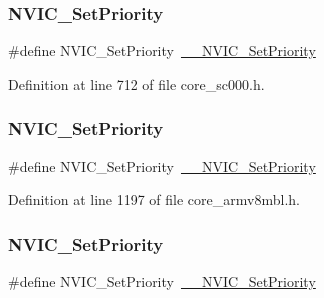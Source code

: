 \subsubsection{\texorpdfstring{N\+V\+I\+C\+\_\+\+Set\+Priority}{NVIC\_SetPriority}\hspace{0.1cm}{\footnotesize\ttfamily [4/13]}}
{\footnotesize\ttfamily \#define N\+V\+I\+C\+\_\+\+Set\+Priority~\hyperlink{group___c_m_s_i_s___core___n_v_i_c_functions_ga505338e23563a9c074910fb14e7d45fd}{\+\_\+\+\_\+\+N\+V\+I\+C\+\_\+\+Set\+Priority}}



Definition at line 712 of file core\+\_\+sc000.\+h.

\mbox{\label{group___c_m_s_i_s___core___n_v_i_c_functions_gae0e9d0e2f7b6133828c71b57d4941c35}} 
\subsubsection{\texorpdfstring{N\+V\+I\+C\+\_\+\+Set\+Priority}{NVIC\_SetPriority}\hspace{0.1cm}{\footnotesize\ttfamily [5/13]}}
{\footnotesize\ttfamily \#define N\+V\+I\+C\+\_\+\+Set\+Priority~\hyperlink{group___c_m_s_i_s___core___n_v_i_c_functions_ga505338e23563a9c074910fb14e7d45fd}{\+\_\+\+\_\+\+N\+V\+I\+C\+\_\+\+Set\+Priority}}



Definition at line 1197 of file core\+\_\+armv8mbl.\+h.

\mbox{\label{group___c_m_s_i_s___core___n_v_i_c_functions_gae0e9d0e2f7b6133828c71b57d4941c35}} 
\subsubsection{\texorpdfstring{N\+V\+I\+C\+\_\+\+Set\+Priority}{NVIC\_SetPriority}\hspace{0.1cm}{\footnotesize\ttfamily [6/13]}}
{\footnotesize\ttfamily \#define N\+V\+I\+C\+\_\+\+Set\+Priority~\hyperlink{group___c_m_s_i_s___core___n_v_i_c_functions_ga505338e23563a9c074910fb14e7d45fd}{\+\_\+\+\_\+\+N\+V\+I\+C\+\_\+\+Set\+Priority}}



